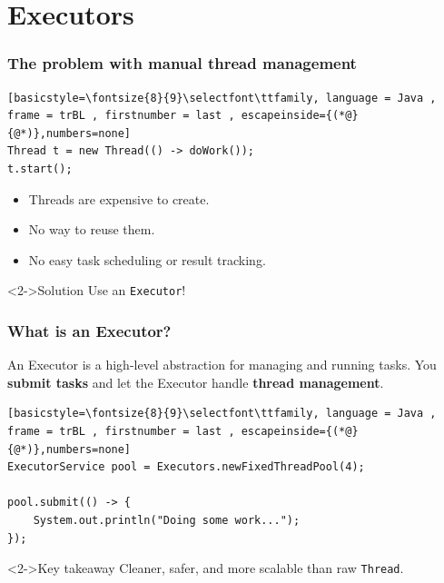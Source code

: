 \documentclass[xcolor={dvipsnames,svgnames},aspectratio=169]{beamer}
\begin{document}
\section{Executors}

\begin{frame}[fragile]
  \frametitle{The problem with manual thread management}

\begin{lstlisting}[basicstyle=\fontsize{8}{9}\selectfont\ttfamily, language = Java ,
frame = trBL , firstnumber = last , escapeinside={(*@}{@*)},numbers=none]
Thread t = new Thread(() -> doWork());
t.start();
\end{lstlisting}

  \begin{itemize}
  \item[\faBook] Threads are expensive to create.
  \item[\faBook] No way to reuse them.
  \item[\faBook] No easy task scheduling or result tracking.
  \end{itemize}

  \begin{block}<2->{\faLightbulb \quad Solution}
    Use an \texttt{Executor}!
  \end{block}

\end{frame}

\begin{frame}[fragile]
  \frametitle{What is an Executor?}

  An Executor is a high-level abstraction for managing and running tasks. You
  \textbf{submit tasks} and let the Executor handle \textbf{thread management}.

\begin{lstlisting}[basicstyle=\fontsize{8}{9}\selectfont\ttfamily, language = Java ,
frame = trBL , firstnumber = last , escapeinside={(*@}{@*)},numbers=none]
ExecutorService pool = Executors.newFixedThreadPool(4);

pool.submit(() -> {
    System.out.println("Doing some work...");
});
\end{lstlisting}

  \begin{block}<2->{\faLightbulb \quad Key takeaway}
    Cleaner, safer, and more scalable than raw \texttt{Thread}.
  \end{block}

\end{frame}
\end{document}
